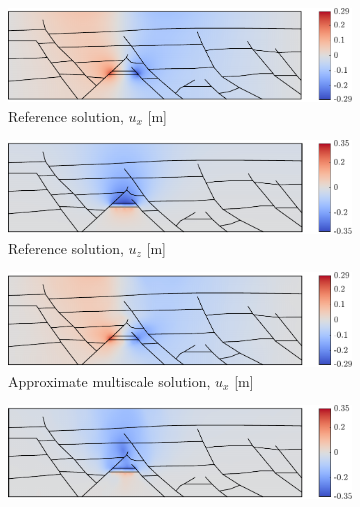 \begin{figure} [htbp]
    \begin{subfigure}{0.48\textwidth}
        \includegraphics[width=\linewidth]{figs/CrossSection/mech_sol_x}
	    \caption{Reference solution, $u_x$ [m]}
        \label{fig:cross_section_mech_sol_x}
    \end{subfigure}
    \hfill
    \begin{subfigure}{0.48\textwidth}
        \includegraphics[width=\linewidth]{figs/CrossSection/mech_sol_z}
	    \caption{Reference solution, $u_z$ [m]}
        \label{fig:cross_section_mech_sol_z}
    \end{subfigure}
    \par\bigskip
    \begin{subfigure}{0.48\textwidth}
        \includegraphics[width=\linewidth]{figs/CrossSection/mech_sol_approx_x}
	    \caption{Approximate multiscale solution, $u_x$ [m]}
        \label{fig:cross_section_mech_sol_approx_x}
    \end{subfigure}
    \hfill
    \begin{subfigure}{0.48\textwidth}
        \includegraphics[width=\linewidth]{figs/CrossSection/mech_sol_approx_z}

\end{subfigure}
\end{figure}
